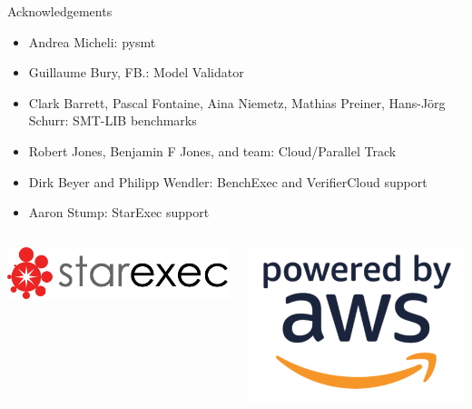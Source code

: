 \documentclass[table]{beamer}
\def\emph#1{\textcolor{MYblue}{#1}}
\begin{document}
\begin{frame}{Acknowledgements}
  \begin{itemize}
    \item \emph{Andrea Micheli}: pysmt
    \item \emph{Guillaume Bury, FB.}: Model Validator
    \item \emph{Clark Barrett, Pascal Fontaine, Aina Niemetz, Mathias Preiner, Hans-Jörg Schurr}: SMT-LIB benchmarks
    \item \emph{Robert Jones, Benjamin F Jones, and team}: Cloud/Parallel Track
    \item \emph{Dirk Beyer and Philipp Wendler}: BenchExec and VerifierCloud support   
    \item \emph{Aaron Stump}: StarExec support
  \end{itemize}
  \bigskip

  \begin{columns}
    \begin{column}{.3\textwidth}
      \includegraphics[width=\textwidth]{starlogo}
    \end{column}
    \begin{column}{.17\textwidth}
      \includegraphics[width=\textwidth]{powered-by-aws}
    \end{column}
  \end{columns}
\end{frame}
\end{document}
